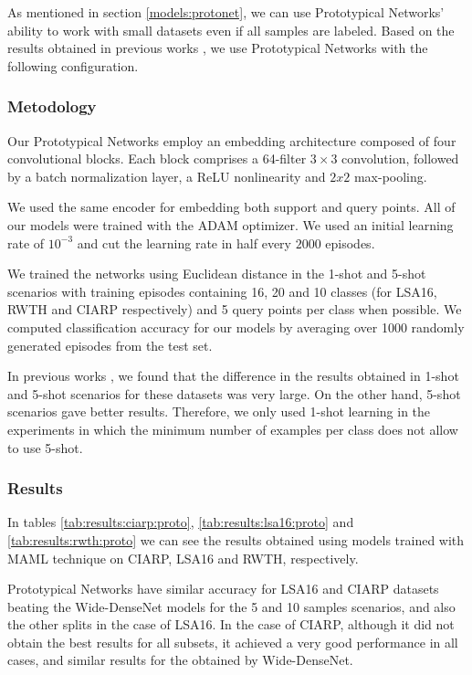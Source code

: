 As mentioned in section \ref{models:protonet}, we can use Prototypical Networks' ability to work with small datasets even if all samples are labeled. Based on the results obtained in previous works \cite{cornejo2019hand}, we use Prototypical Networks with the following configuration.

\subsubsection{Metodology}

Our Prototypical Networks employ an embedding architecture composed of four convolutional blocks. Each block comprises a 64-filter $3 \times 3$ convolution, followed by a batch normalization layer, a ReLU nonlinearity and $2 x 2$ max-pooling.

We used the same encoder for embedding both support and query points. All of our models were trained with the ADAM\cite{Adam} optimizer. We used an initial learning rate of $10^{-3}$ and cut the learning rate in half every $2000$ episodes.

We trained the networks using Euclidean distance in the 1-shot and 5-shot scenarios with training episodes containing 16, 20 and 10 classes (for LSA16, RWTH and CIARP respectively) and 5 query points per class when possible. We computed classification accuracy for our models by averaging over 1000 randomly generated episodes from the test set.

In previous works \cite{cornejo2019hand}, we found that the difference in the results obtained in 1-shot and 5-shot scenarios for these datasets was very large. On the other hand, 5-shot scenarios gave better results. Therefore, we only used 1-shot learning in the experiments in which the minimum number of examples per class does not allow to use 5-shot.

\subsubsection{Results}

In tables \ref{tab:results:ciarp:proto}, \ref{tab:results:lsa16:proto} and \ref{tab:results:rwth:proto} we can see the results obtained using models trained with MAML technique on CIARP, LSA16 and RWTH, respectively. 

Prototypical Networks have similar accuracy for LSA16 and CIARP datasets beating the Wide-DenseNet models for the 5 and 10 samples scenarios, and also the other splits in the case of LSA16. In the case of CIARP, although it did not obtain the best results for all subsets, it achieved a very good performance in all cases, and similar results for the obtained by Wide-DenseNet.

